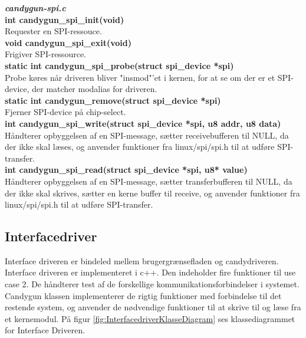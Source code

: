 \noindent\textit{\textbf{candygun-spi.c}} \\

\noindent\textbf{int candygun\_spi\_init(void)} \\
Requester en SPI-ressouce. \\

\noindent\textbf{void candygun\_spi\_exit(void)} \\
Frigiver SPI-ressource. \\

\noindent\textbf{static int candygun\_spi\_probe(struct spi\_device *spi)} \\
Probe køres når driveren bliver "insmod"'et i kernen, for at se om der er et SPI-device, der matcher modalias for driveren.\\

\noindent\textbf{static int candygun\_remove(struct spi\_device *spi)} \\ 
Fjerner SPI-device på chip-select.\\

\noindent\textbf{int candygun\_spi\_write(struct spi\_device *spi, u8 addr, u8 data)} \\
Håndterer opbyggelsen af en SPI-message, sætter receivebufferen til NULL, da der ikke skal læses, og anvender funktioner fra linux/spi/spi.h til at udføre SPI-transfer. \\

\noindent\textbf{int candygun\_spi\_read(struct spi\_device *spi, u8* value)} \\
Håndterer opbyggelsen af en SPI-message, sætter transferbufferen til NULL, da der ikke skal skrives, sætter en kerne buffer til receive, og anvender funktioner fra linux/spi/spi.h til at udføre SPI-transfer.  \\


\subsection{Interfacedriver}
Interface driveren er bindeled mellem brugergrænsefladen og candydriveren. Interface driveren er implementeret i c++. Den indeholder fire funktioner til use case 2. De håndterer test af de forskellige kommunikationsforbindelser i systemet. Candygun klassen implementerer de rigtig funktioner med forbindelse til det restende system, og anvender de nødvendige funktioner til at skrive til og læse fra et kernemodul. På figur \ref{fig:InterfacedriverKlasseDiagram} ses klassediagrammet for Interface Driveren. 

